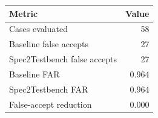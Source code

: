 \begin{tabular}{l r}
\hline
Metric & Value \\
\hline
Cases evaluated & 58 \\
Baseline false accepts & 27 \\
Spec2Testbench false accepts & 27 \\
Baseline FAR & 0.964 \\
Spec2Testbench FAR & 0.964 \\
False-accept reduction & 0.000 \\
\hline
\end{tabular}

